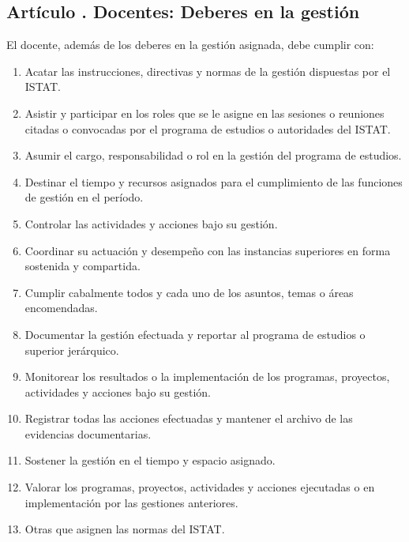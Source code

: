 \subsection{Artículo . Docentes: Deberes en la gestión}
\addtocounter{ns}{1}
El docente, además de los deberes en la gestión asignada, debe cumplir con:
\begin{enumerate}
\item Acatar las instrucciones, directivas y normas de la gestión dispuestas por el ISTAT. 
\item Asistir y participar en los roles que se le asigne en las sesiones o reuniones citadas o convocadas por el programa de estudios o autoridades del ISTAT. 
\item Asumir el cargo, responsabilidad o rol en la gestión del programa de estudios. 
\item Destinar el tiempo y recursos asignados para el cumplimiento de las funciones de gestión en el período. 
\item Controlar las actividades y acciones bajo su gestión. 
\item Coordinar su actuación y desempeño con las instancias superiores en forma sostenida y compartida. 
\item Cumplir cabalmente todos y cada uno de los asuntos, temas o áreas encomendadas. 
\item Documentar la gestión efectuada y reportar al programa de estudios o superior jerárquico. 
\item Monitorear los resultados o la implementación de los programas, proyectos, actividades y acciones bajo su gestión. 
\item Registrar todas las acciones efectuadas y mantener el archivo de las evidencias documentarias. 
\item Sostener la gestión en el tiempo y espacio asignado. 
\item Valorar los programas, proyectos, actividades y acciones ejecutadas o en implementación por las gestiones anteriores. 
\item Otras que asignen las normas del ISTAT. 
\end{enumerate}

